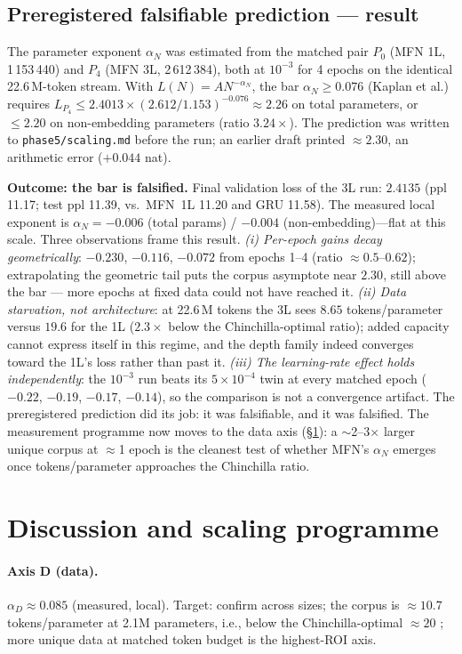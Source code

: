 \documentclass[11pt]{article}
\begin{document}
\subsection{Preregistered falsifiable prediction --- result}\label{sec:prereg}
The parameter exponent $\alpha_N$ was estimated from the matched pair
$P_0$ (MFN 1L, 1\,153\,440) and $P_4$ (MFN 3L, 2\,612\,384), both at
$10^{-3}$ for 4 epochs on the identical 22.6\,M-token stream. With
$L(N) = A N^{-\alpha_N}$, the bar $\alpha_N \ge 0.076$ (Kaplan et al.)
requires $L_{P_4} \le 2.4013 \times (2.612/1.153)^{-0.076} \approx 2.26$ on
total parameters, or $\le 2.20$ on non-embedding parameters (ratio
$3.24\times$). The prediction was written to \texttt{phase5/scaling.md}
before the run; an earlier draft printed $\approx 2.30$, an arithmetic error
($+0.044$ nat).

\textbf{Outcome: the bar is falsified.} Final validation loss of the 3L run:
$\mathbf{2.4135}$ (ppl 11.17; test ppl 11.39, vs.\ MFN~1L 11.20 and GRU
11.58). The measured local exponent is $\alpha_N = -0.006$ (total params) /
$-0.004$ (non-embedding)---flat at this scale. Three observations frame this
result. \emph{(i) Per-epoch gains decay geometrically}: $-0.230$, $-0.116$,
$-0.072$ from epochs 1--4 (ratio $\approx 0.5$--$0.62$); extrapolating the
geometric tail puts the corpus asymptote near $2.30$, still above the bar ---
more epochs at fixed data could not have reached it. \emph{(ii) Data
starvation, not architecture}: at 22.6\,M tokens the 3L sees
$8.65$ tokens/parameter versus $19.6$ for the 1L ($2.3\times$ below the
Chinchilla-optimal ratio); added capacity cannot express itself in this
regime, and the depth family indeed converges toward the 1L's loss rather
than past it. \emph{(iii) The learning-rate effect holds independently}: the
$10^{-3}$ run beats its $5\times10^{-4}$ twin at every matched epoch
($-0.22$, $-0.19$, $-0.17$, $-0.14$), so the comparison is not a
convergence artifact. The preregistered prediction did its job: it was
falsifiable, and it was falsified. The measurement programme now moves to
the data axis (\S\ref{sec:discussion}): a $\sim$2--3$\times$ larger unique
corpus at $\approx$1 epoch is the cleanest test of whether MFN's
$\alpha_N$ emerges once tokens/parameter approaches the Chinchilla ratio.

\section{Discussion and scaling programme}\label{sec:discussion}
\paragraph{Axis D (data).} $\alpha_D \approx 0.085$ (measured, local).
Target: confirm across sizes; the corpus is $\approx 10.7$ tokens/parameter
at 2.1M parameters, i.e., below the Chinchilla-optimal $\approx 20$
\citep{hoffmann2022chinchilla}; more unique data at matched token budget is
the highest-ROI axis.
\end{document}
